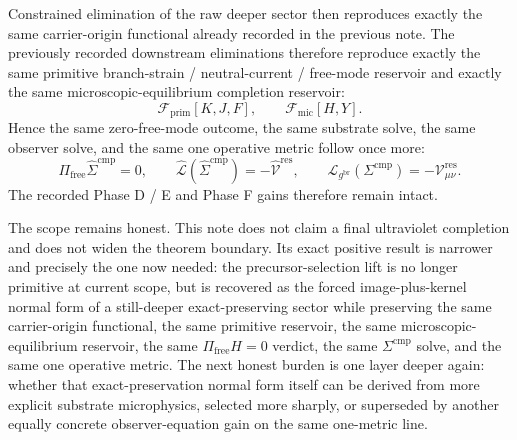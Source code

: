 \documentclass[11pt]{article}
\newcommand{\ObserverMetric}{g^{\mathrm{br}}}
\newcommand{\CompShift}{\Sigma^{\mathrm{cmp}}}
\newcommand{\CompLift}{\widehat\Sigma^{\mathrm{cmp}}}
\newcommand{\ResidualCore}{\mathcal V_{\mu\nu}^{\mathrm{res}}}
\newcommand{\ResidualLift}{\widehat{\mathcal V}^{\mathrm{res}}}
\newcommand{\SubReducedEin}{\widehat{\mathcal L}}
\newcommand{\FreeProj}{\Pi_{\mathrm{free}}}
\newcommand{\GaugeAux}{Y}
\newcommand{\ReducedEin}{\mathcal L_{\ObserverMetric}}
\newcommand{\MicFunctional}{\mathscr F_{\mathrm{mic}}}
\newcommand{\PrimFunctional}{\mathscr F_{\mathrm{prim}}}
\newcommand{\PrimStrain}{K}
\newcommand{\PrimNeutral}{J}
\newcommand{\PrimFree}{F}
\begin{document}
Constrained elimination of the raw deeper sector then reproduces exactly the same carrier-origin functional already recorded in the previous note. The previously recorded downstream eliminations therefore reproduce exactly the same primitive branch-strain / neutral-current / free-mode reservoir and exactly the same microscopic-equilibrium completion reservoir:
\[
\PrimFunctional[\PrimStrain,\PrimNeutral,\PrimFree],
\qquad
\MicFunctional[H,\GaugeAux].
\]
Hence the same zero-free-mode outcome, the same substrate solve, the same observer solve, and the same one operative metric follow once more:
\[
\FreeProj\CompLift=0,
\qquad
\SubReducedEin(\CompLift)=-\ResidualLift,
\qquad
\ReducedEin(\CompShift)=-\ResidualCore.
\]
The recorded Phase D / E and Phase F gains therefore remain intact.

The scope remains honest. This note does not claim a final ultraviolet completion and does not widen the theorem boundary. Its exact positive result is narrower and precisely the one now needed: the precursor-selection lift is no longer primitive at current scope, but is recovered as the forced image-plus-kernel normal form of a still-deeper exact-preserving sector while preserving the same carrier-origin functional, the same primitive reservoir, the same microscopic-equilibrium reservoir, the same \(\Pi_{\mathrm{free}}H=0\) verdict, the same \(\Sigma^{\mathrm{cmp}}\) solve, and the same one operative metric. The next honest burden is one layer deeper again: whether that exact-preservation normal form itself can be derived from more explicit substrate microphysics, selected more sharply, or superseded by another equally concrete observer-equation gain on the same one-metric line.
\end{document}
